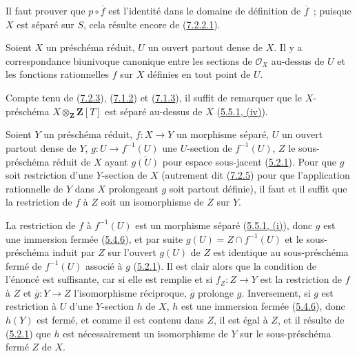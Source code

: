 Il faut prouver que $p\circ\overline f$ est l'identité dans le domaine de
définition de $\overline f$~; puisque $X$ est séparé sur $S$, cela résulte
encore de (\hyperref[I.7.2.2.1-fr]{7.2.2.1}).

\begin{corollary}[7.2.6]
\label{I.7.2.6-fr}
Soient $X$ un préschéma réduit, $U$ un ouvert partout dense de $X$. Il y a
correspondance biunivoque canonique entre les sections de $\mathscr{O}_X$ au-dessus
de $U$ et les fonctions rationnelles $f$ sur $X$ définies en tout point de $U$.
\end{corollary}

Compte tenu de (\hyperref[I.7.2.3-fr]{7.2.3}),
(\hyperref[I.7.1.2-fr]{7.1.2}) et (\hyperref[I.7.1.3-fr]{7.1.3}), il suffit de
remarquer que le $X$-préschéma $X\otimes_{\mathbf Z}\mathbf Z[T]$ est séparé
au-dessus de $X$ (\hyperref[I.5.5.1-fr]{5.5.1, (iv)}).

\begin{corollary}[7.2.7]
\label{I.7.2.7-fr}
Soient $Y$ un préschéma réduit, $f:X\to Y$ un morphisme séparé, $U$ un ouvert
partout dense de $Y$, $g:U\to f^{-1}(U)$ une $U$-section de $f^{-1}(U)$, $Z$
le sous-préschéma réduit de $X$ ayant $\overline{g(U)}$ pour espace sous-jacent
(\hyperref[I.5.2.1-fr]{5.2.1}). Pour que $g$ soit restriction d'une
$Y$-section de $X$ (autrement dit (\hyperref[I.7.2.5-fr]{7.2.5}) pour que
l'application rationnelle de $Y$ dans $X$ prolongeant $g$ soit partout
définie), il faut et il suffit que la restriction de $f$ à $Z$ soit un
isomorphisme de $Z$ sur $Y$.
\end{corollary}

La restriction de $f$ à $f^{-1}(U)$ est un morphisme séparé
(\hyperref[I.5.5.1-fr]{5.5.1, (i)}), donc $g$ est une immersion fermée
(\hyperref[I.5.4.6-fr]{5.4.6}), et par suite
$g(U)=Z\cap f^{-1}(U)$ et le sous-préschéma induit par $Z$ sur l'ouvert
$g(U)$ de $Z$ est identique au sous-préschéma fermé de $f^{-1}(U)$ associé à
$g$ (\hyperref[I.5.2.1-fr]{5.2.1}). Il est clair alors que la condition de
l'énoncé est suffisante, car si elle est remplie et si $f_Z:Z\to Y$ est la
restriction de $f$ à $Z$ et $\overline g:Y\to Z$ l'isomorphisme réciproque,
$\overline g$ prolonge $g$. Inversement, si $g$ est restriction à $U$ d'une
$Y$-section $h$ de $X$, $h$ est une immersion fermée
(\hyperref[I.5.4.6-fr]{5.4.6}), donc $h(Y)$ est fermé, et comme il est contenu
dans $Z$, il est égal à $Z$, et il résulte de
(\hyperref[I.5.2.1-fr]{5.2.1}) que $h$ est nécessairement un isomorphisme de
$Y$ sur le sous-préschéma fermé $Z$ de $X$.

